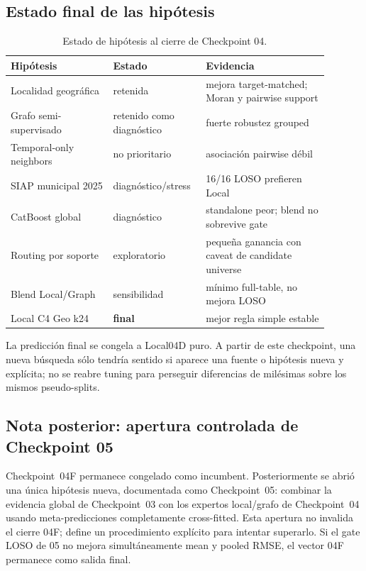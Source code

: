 \subsection{Estado final de las hipótesis}

\begin{table}[H]
\centering
\caption{Estado de hipótesis al cierre de Checkpoint 04.}
\label{tab:cp04f-hypotheses}
\small
\begin{tabular}{p{0.30\linewidth}p{0.23\linewidth}p{0.36\linewidth}}
\toprule
Hipótesis & Estado & Evidencia \\
\midrule
Localidad geográfica & retenida & mejora target-matched; Moran y pairwise support \\
Grafo semi-supervisado & retenido como diagnóstico & fuerte robustez grouped \\
Temporal-only neighbors & no prioritario & asociación pairwise débil \\
SIAP municipal 2025 & diagnóstico/stress & 16/16 LOSO prefieren Local \\
CatBoost global & diagnóstico & standalone peor; blend no sobrevive gate \\
Routing por soporte & exploratorio & pequeña ganancia con caveat de candidate universe \\
Blend Local/Graph & sensibilidad & mínimo full-table, no mejora LOSO \\
Local C4 Geo k24 & \textbf{final} & mejor regla simple estable \\
\bottomrule
\end{tabular}
\end{table}

\begin{decision}
La predicción final se congela a Local04D puro. A partir de este checkpoint, una nueva
búsqueda sólo tendría sentido si aparece una fuente o hipótesis nueva y explícita; no se
reabre tuning para perseguir diferencias de milésimas sobre los mismos pseudo-splits.
\end{decision}


\subsection{Nota posterior: apertura controlada de Checkpoint 05}

Checkpoint~04F permanece congelado como incumbent. Posteriormente se abrió una única hipótesis
nueva, documentada como Checkpoint~05: combinar la evidencia global de Checkpoint~03 con los
expertos local/grafo de Checkpoint~04 usando meta-predicciones completamente cross-fitted.
Esta apertura no invalida el cierre 04F; define un procedimiento explícito para intentar
superarlo. Si el gate LOSO de 05 no mejora simultáneamente mean y pooled RMSE, el vector 04F
permanece como salida final.
